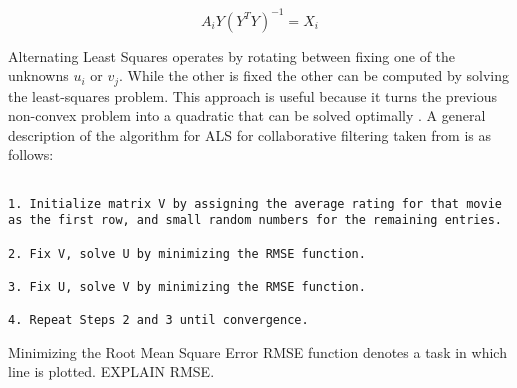 \documentclass[main.tex]{thesis.tex}
\begin{document}
\begin{equation}
A_iY(Y^T Y)^{-1} = X_i
\end{equation}

Alternating Least Squares operates by rotating between fixing one of the unknowns $u_i$ or $v_j$.
While the other is fixed the other can be computed by solving the least-squares problem.
This approach is useful because it turns the previous non-convex problem into a quadratic that can be solved optimally \cite{aberger14}.
A general description of the algorithm for ALS for collaborative filtering taken from \cite{aberger14} is as follows:

\begin{lstlisting}[caption=Alternating Least Squares algorithm \cite{aberger14}]

1. Initialize matrix V by assigning the average rating for that movie as the first row, and small random numbers for the remaining entries.

2. Fix V, solve U by minimizing the RMSE function.

3. Fix U, solve V by minimizing the RMSE function.

4. Repeat Steps 2 and 3 until convergence.

\end{lstlisting}

Minimizing the Root Mean Square Error RMSE function denotes a task in which line is plotted. EXPLAIN RMSE.
\end{document}
